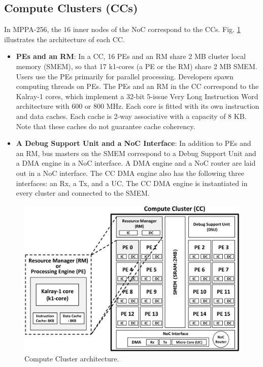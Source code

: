 \subsection{Compute Clusters (CCs)}
\label{sec:cc}
In MPPA-256, the 16 inner nodes of the NoC correspond to the CCs.
Fig. \ref{fig:cc_architecture} illustrates the architecture of each CC.

\begin{itemize}
  \setlength{\leftskip}{-5mm}    
  \item \textbf{PEs and an RM}:
  In a CC, 16 PEs and an RM share 2 MB cluster local memory (SMEM), so that 17 k1-cores (a PE or the RM) share 2 MB SMEM.
  Users use the PEs primarily for parallel processing.
  Developers spawn computing threads on PEs.
  The PEs and an RM in the CC correspond to the Kalray-1 cores, which implement a 32-bit 5-issue Very Long Instruction Word architecture with 600 or 800 MHz.
  Each core is fitted with its own instruction and data caches.
  Each cache is 2-way associative with a capacity of 8 KB.
  Note that these caches do not guarantee cache coherency.
  
  \item \textbf{A Debug Support Unit and a NoC Interface}:
  In addition to PEs and an RM, bus masters on the SMEM correspond to a Debug Support Unit and a DMA engine in a NoC interface.
  A DMA engine and a NoC router are laid out in a NoC interface.
  The CC DMA engine also has the following three interfaces: an Rx, a Tx, and a UC. 
  The CC DMA engine is instantiated in every cluster and connected to the SMEM.
\end{itemize}
\begin{figure}[thbp]
  \centering
  \includegraphics[width=0.7\linewidth]{../figure/cc_architecture.eps}
  \caption{\label{fig:cc_architecture}
    Compute Cluster architecture.}
\end{figure}

